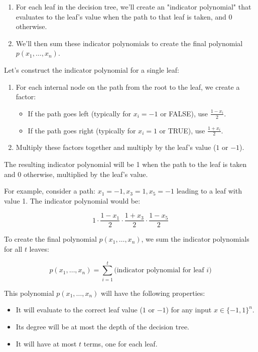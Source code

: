 \documentclass{article}
\begin{document}
\begin{enumerate}
    \item For each leaf in the decision tree, we'll create an "indicator polynomial" that evaluates to the leaf's value when the path to that leaf is taken, and 0 otherwise.
    \item We'll then sum these indicator polynomials to create the final polynomial $p(x_1,\ldots,x_n)$.
\end{enumerate}

Let's construct the indicator polynomial for a single leaf:

\begin{enumerate}
    \item For each internal node on the path from the root to the leaf, we create a factor:
    \begin{itemize}
        \item If the path goes left (typically for $x_i = -1$ or FALSE), use $\frac{1-x_i}{2}$.
        \item If the path goes right (typically for $x_i = 1$ or TRUE), use $\frac{1+x_i}{2}$.
    \end{itemize}
    \item Multiply these factors together and multiply by the leaf's value ($1$ or $-1$).
\end{enumerate}

The resulting indicator polynomial will be 1 when the path to the leaf is taken and 0 otherwise, multiplied by the leaf's value.

For example, consider a path: $x_1 = -1, x_3 = 1, x_5 = -1$ leading to a leaf with value 1. The indicator polynomial would be:

\[
1 \cdot \frac{1-x_1}{2} \cdot \frac{1+x_3}{2} \cdot \frac{1-x_5}{2}
\]

To create the final polynomial $p(x_1,\ldots,x_n)$, we sum the indicator polynomials for all $t$ leaves:

\[
p(x_1,\ldots,x_n) = \sum_{i=1}^t \text{(indicator polynomial for leaf } i\text{)}
\]

This polynomial $p(x_1,\ldots,x_n)$ will have the following properties:
\begin{itemize}
    \item It will evaluate to the correct leaf value ($1$ or $-1$) for any input $x \in \{-1,1\}^n$.
    \item Its degree will be at most the depth of the decision tree.
    \item It will have at most $t$ terms, one for each leaf.
\end{itemize}
\end{document}
